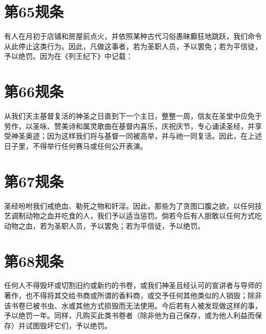 
\section{第65规条}

有人在月初于店铺和房屋前点火，并依照某种古代习俗愚昧癫狂地跳跃，我们命令从此停止这类行为。因此，凡做这事者，若为圣职人员，予以罢免；若为平信徒，予以绝罚。因为在《列王纪下》中记载：\par


\section{第66规条}

从我们天主基督复活的神圣之日直到下一个主日，整整一周，信友在圣堂中应免于劳作，以圣咏、赞美诗和属灵歌曲在基督内喜乐，庆祝庆节，专心诵读圣经，并享受神圣奥迹；因为这样我们将与基督一同被高举，并与祂一同复活。因此，在上述日子里，不得举行任何赛马或任何公开表演。\par


\section{第67规条}

圣经吩咐我们戒绝血、勒死之物和奸淫。因此，那些为了贪图口腹之欲，以任何技艺调制动物之血并吃食的人，我们予以适当惩罚。倘若今后有人胆敢以任何方式吃动物之血，若为圣职人员，予以罢免；若为平信徒，予以绝罚。\par


\section{第68规条}

任何人不得毁坏或切割旧约或新约的书卷，或我们神圣且经认可的宣讲者与导师的著作，也不得将其交给书商或所谓的香料商，或交予任何其他类似的人销毁；除非该书卷已被书虫、水或其他方式损毁而无法使用。今后若有人被发现做这样的事，予以绝罚一年。同样，凡购买此类书卷者（除非他为自己保存，或为他人利益而保存）并试图毁坏它们，予以绝罚。\par

